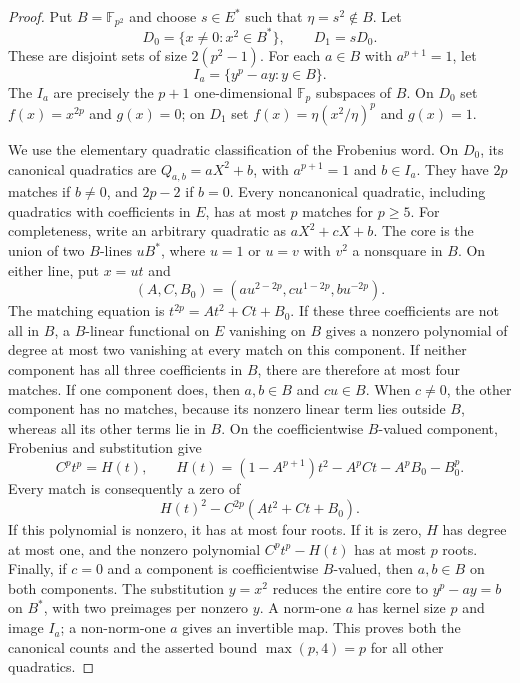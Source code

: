 \begin{proof}
Put $B=\mathbb F_{p^2}$ and choose $s\in E^*$ such that
$\eta=s^2\notin B$. Let
\[
 D_0=\{x\ne0:x^2\in B^*\},\qquad D_1=sD_0.
\]
These are disjoint sets of size $2(p^2-1)$. For each $a\in B$ with
$a^{p+1}=1$, let
\[
 I_a=\{y^p-ay:y\in B\}.
\]
The $I_a$ are precisely the $p+1$ one-dimensional $\mathbb F_p$ subspaces
of $B$. On $D_0$ set $f(x)=x^{2p}$ and $g(x)=0$; on $D_1$ set
$f(x)=\eta(x^2/\eta)^p$ and $g(x)=1$.

We use the elementary quadratic classification of the Frobenius word.
On $D_0$, its canonical quadratics are
$Q_{a,b}=aX^2+b$, with $a^{p+1}=1$ and $b\in I_a$.
They have $2p$ matches if $b\ne0$, and $2p-2$ if $b=0$.
Every noncanonical quadratic, including quadratics with coefficients in
$E$, has at most $p$ matches for $p\ge5$.
For completeness, write an arbitrary quadratic as $aX^2+cX+b$.
The core is the union of two $B$-lines $uB^*$, where $u=1$ or
$u=v$ with $v^2$ a nonsquare in $B$. On either line, put $x=ut$ and
\[
 (A,C,B_0)=(a u^{2-2p},c u^{1-2p},b u^{-2p}).
\]
The matching equation is $t^{2p}=At^2+Ct+B_0$.
If these three coefficients are not all in $B$, a $B$-linear functional
on $E$ vanishing on $B$ gives a nonzero polynomial of degree at most two
vanishing at every match on this component. If neither component has
all three coefficients in $B$, there are therefore at most four matches.
If one component does, then $a,b\in B$ and $cu\in B$.
When $c\ne0$, the other component has no matches, because its nonzero
linear term lies outside $B$, whereas all its other terms lie in $B$.
On the coefficientwise $B$-valued component, Frobenius and substitution give
\[
 C^p t^p=H(t),\qquad
 H(t)=(1-A^{p+1})t^2-A^pCt-A^pB_0-B_0^p.
\]
Every match is consequently a zero of
\[
 H(t)^2-C^{2p}(At^2+Ct+B_0).
\]
If this polynomial is nonzero, it has at most four roots. If it is zero,
$H$ has degree at most one, and the nonzero polynomial
$C^pt^p-H(t)$ has at most $p$ roots. Finally, if $c=0$ and a component
is coefficientwise $B$-valued, then $a,b\in B$ on both components.
The substitution $y=x^2$ reduces the entire core to $y^p-ay=b$ on $B^*$,
with two preimages per nonzero $y$. A norm-one $a$ has kernel size $p$
and image $I_a$; a non-norm-one $a$ gives an invertible map. This proves
both the canonical counts and the asserted bound $\max(p,4)=p$ for
all other quadratics.


\end{proof}
